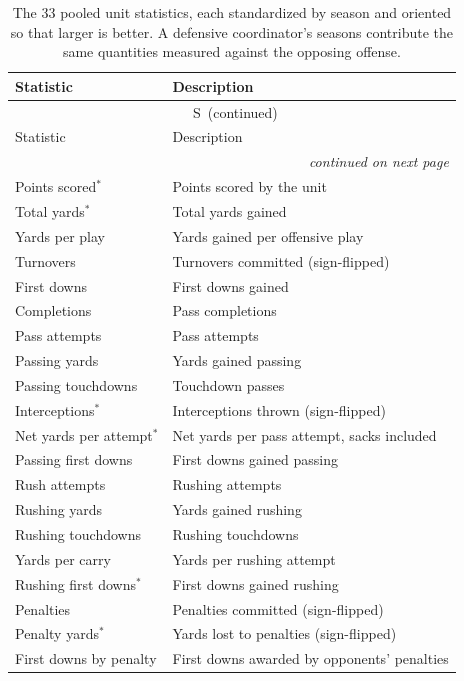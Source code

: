 \documentclass[12pt,USenglish]{article}
\renewcommand{\thetable}{S\arabic{table}}
\begin{document}
{\footnotesize\singlespacing
\begin{longtable}{@{}l l@{}}
\caption{The 33 pooled unit statistics, each standardized by season and oriented so that larger is better. A defensive coordinator's seasons contribute the same quantities measured against the opposing offense.}
\label{supp:unitstats}\\
\toprule
Statistic & Description \\
\midrule
\endfirsthead
\multicolumn{2}{c}{\tablename~\thetable\ (continued)}\\[2pt]
\toprule
Statistic & Description \\
\midrule
\endhead
\midrule
\multicolumn{2}{r}{\footnotesize\itshape continued on next page}\\
\endfoot
\bottomrule
\endlastfoot
Points scored$^{\ast}$ & Points scored by the unit \\
Total yards$^{\ast}$ & Total yards gained \\
Yards per play & Yards gained per offensive play \\
Turnovers & Turnovers committed (sign-flipped) \\
First downs & First downs gained \\
Completions & Pass completions \\
Pass attempts & Pass attempts \\
Passing yards & Yards gained passing \\
Passing touchdowns & Touchdown passes \\
Interceptions$^{\ast}$ & Interceptions thrown (sign-flipped) \\
Net yards per attempt$^{\ast}$ & Net yards per pass attempt, sacks included \\
Passing first downs & First downs gained passing \\
Rush attempts & Rushing attempts \\
Rushing yards & Yards gained rushing \\
Rushing touchdowns & Rushing touchdowns \\
Yards per carry & Yards per rushing attempt \\
Rushing first downs$^{\ast}$ & First downs gained rushing \\
Penalties & Penalties committed (sign-flipped) \\
Penalty yards$^{\ast}$ & Yards lost to penalties (sign-flipped) \\
First downs by penalty & First downs awarded by opponents' penalties \\

\end{longtable}}
\end{document}
